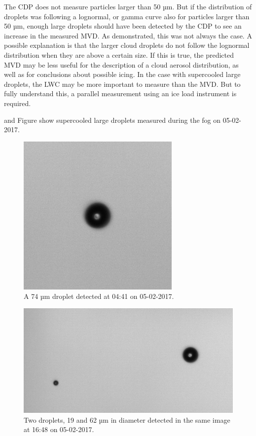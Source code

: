 The CDP does not measure particles larger than 50 µm. But if the distribution of droplets was following a lognormal, or gamma curve \cite{miles2000,lee2010} also for particles larger than 50 µm, enough large droplets should have been detected by the CDP to see an increase in the measured MVD. As demonstrated, this was not always the case. A possible explanation is that the larger cloud droplets do not follow the lognormal distribution when they are above a certain size. If this is true, the predicted MVD may be less useful for the description of a cloud aerosol distribution, as well as for conclusions about possible icing. In the case with supercooled large droplets, the LWC may be more important to measure than the MVD. But to fully understand this, a parallel measurement using an ice load instrument is required.

 and Figure  show supercooled large droplets measured during the fog on 05-02-2017.

\begin{figure}[ht]
  \centering
  \includegraphics[width=0.4\linewidth]{figures/170205_0441_droplet_74um}
\caption{A 74 µm droplet detected at 04:41 on 05-02-2017.}
\label{fig:170505_0441_droplet}
\end{figure}
\begin{figure}[ht]
  \centering
  \includegraphics[width=0.8\linewidth]{figures/170205_1648_droplet_19and62um}
\caption{Two droplets, 19 and 62 µm in diameter detected in the same image at 16:48 on 05-02-2017.}
\label{fig:170505_1648_droplet}
\end{figure}


